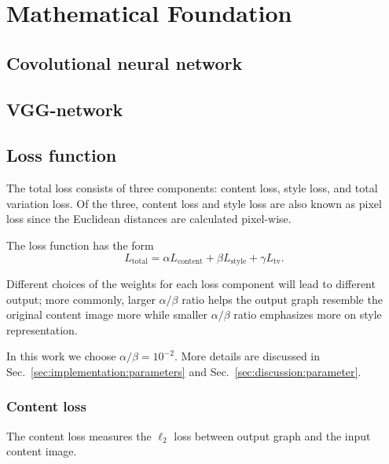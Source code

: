 
\chapter{Mathematical Foundation}
\label{chap:foundation}


\section{Covolutional neural network}
\label{sec:foundation:cnn}





\section{VGG-network}
\label{sec:foundation:vgg}





\section{Loss function}
\label{sec:foundation:loss}

The total loss consists of three components: content loss, style loss, and total variation loss.
Of the three, content loss and style loss are also known as pixel loss since
the Euclidean distances are calculated pixel-wise.

The loss function has the form
    \begin{equation}
    \label{eq:loss:total}
    L_{\text{total}} = \alpha L_{\text{content}} + \beta L_{\text{style}} + \gamma L_{\text{tv}}.
    \end{equation}

Different choices of the weights for each loss component will lead to different output;
more commonly, larger $\alpha / \beta$ ratio helps the output graph resemble the original content image more
while smaller $\alpha / \beta$ ratio emphasizes more on style representation.

In this work we choose $\alpha / \beta = 10^{-2}$.
More details are discussed in Sec.\ \ref{sec:implementation:parameters} and
Sec.\ \ref{sec:discussion:parameter}.


\subsection{Content loss}
The content loss measures the $\ell_2$ loss between output graph and the input content image.


